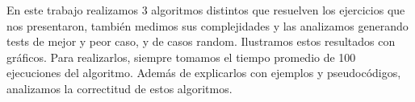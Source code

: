 En este trabajo realizamos 3 algoritmos distintos que resuelven los ejercicios que nos presentaron, también medimos sus complejidades y las analizamos generando tests de mejor y peor caso, y de casos random. Ilustramos estos resultados con gráficos. Para realizarlos, siempre tomamos el tiempo promedio de 100 ejecuciones del algoritmo. Además de explicarlos con ejemplos y pseudocódigos, analizamos la correctitud de estos algoritmos.
